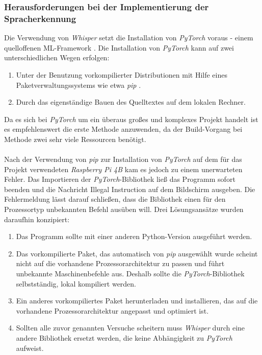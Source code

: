 \subsubsection{Herausforderungen bei der Implementierung der Spracherkennung}
Die Verwendung von \textit{Whisper} setzt die Installation von \textit{PyTorch} voraus - einem quelloffenen \ac{ML}-Framework \cite{pytorch}. Die Installation von \textit{PyTorch} kann auf zwei unterschiedlichen Wegen erfolgen:
\begin{enumerate}
    \item Unter der Benutzung vorkompilierter Distributionen mit Hilfe eines Paketverwaltungssystems wie etwa \textit{pip} \cite{pip}.
    \item Durch das eigenständige Bauen des Quelltextes auf dem lokalen Rechner.
\end{enumerate}
Da es sich bei \textit{PyTorch} um ein überaus großes und komplexes Projekt handelt ist es empfehlenswert die erste Methode anzuwenden, da der Build-Vorgang bei Methode zwei sehr viele Ressourcen benötigt.\\\\
Nach der Verwendung von \textit{pip} zur Installation von \textit{PyTorch} auf dem für das Projekt verwendeten \textit{Raspberry Pi 4B} kam es jedoch zu einem unerwarteten Fehler. Das Importieren der \textit{PyTorch}-Bibliothek ließ das Programm sofort beenden und die Nachricht \glqq{}Illegal Instruction\grqq{} auf dem Bildschirm ausgeben. Die Fehlermeldung lässt darauf schließen, dass die Bibliothek einen für den Prozessortyp unbekannten Befehl ausüben will. Drei Lösungsansätze wurden daraufhin konzipiert:
\begin{enumerate}
    \item Das Programm sollte mit einer anderen Python-Version ausgeführt werden.
    \item Das vorkompilierte Paket, das automatisch von \textit{pip} ausgewählt wurde scheint nicht auf die vorhandene Prozessorarchitektur zu passen und führt unbekannte Maschinenbefehle aus. Deshalb sollte die \textit{PyTorch}-Bibliothek selbstständig, lokal kompiliert werden.
    \item Ein anderes vorkompiliertes Paket herunterladen und installieren, das auf die vorhandene Prozessorarchitektur angepasst und optimiert ist.
    \item Sollten alle zuvor genannten Versuche scheitern muss \textit{Whisper} durch eine andere Bibliothek ersetzt werden, die keine Abhängigkeit zu \textit{PyTorch} aufweist.
\end{enumerate}
